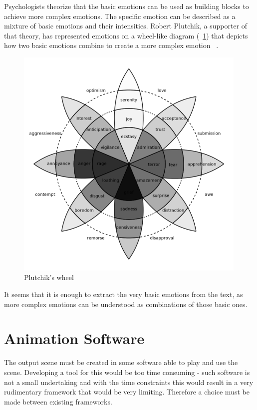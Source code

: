Psychologists theorize that the basic emotions can be used as building blocks to achieve more complex emotions. The specific emotion can be described as a mixture of basic emotions and their intensities. Robert Plutchik, a supporter of that theory, has represented emotions on a wheel-like diagram (~\ref{fig:wheel}) that depicts how two basic emotions combine to create a more complex emotion ~\cite{basicemo}.

\begin{figure}[!ht]
\centerline{\includegraphics[width = 30em]{img/wheel.png}}
\caption{Plutchik's wheel}\label{fig:wheel}
\end{figure}

It seems that it is enough to extract the very basic emotions from the text, as more complex emotions can be understood as combinations of those basic ones.


\section{Animation Software}
\label{sec:animchoice}

The output scene must be created in some software able to play and use the scene. Developing a tool for this would be too time consuming - such software is not a small undertaking and with the time constraints this would result in a very rudimentary framework that would be very limiting. Therefore a choice must be made between existing frameworks.

